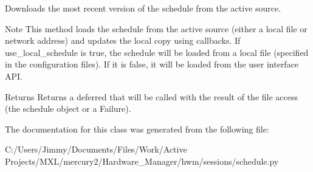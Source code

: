 Downloads the most recent version of the schedule from the active source. 

\begin{DoxyNote}{Note}
This method loads the schedule from the active source (either a local file or network address) and updates the local copy using callbacks. If use\-\_\-local\-\_\-schedule is true, the schedule will be loaded from a local file (specified in the configuration files). If it is false, it will be loaded from the user interface A\-P\-I.
\end{DoxyNote}
\begin{DoxyReturn}{Returns}
Returns a deferred that will be called with the result of the file access (the schedule object or a Failure). 
\end{DoxyReturn}


The documentation for this class was generated from the following file\-:\begin{DoxyCompactItemize}
\item 
C\-:/\-Users/\-Jimmy/\-Documents/\-Files/\-Work/\-Active Projects/\-M\-X\-L/mercury2/\-Hardware\-\_\-\-Manager/hwm/sessions/schedule.\-py\end{DoxyCompactItemize}
